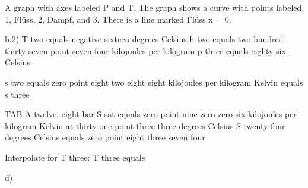 A graph with axes labeled P and T. The graph shows a curve with points labeled 1, Flüss, 2, Dampf, and 3. There is a line marked Flüss x = 0.

b.2) T two equals negative sixteen degrees Celsius  
h two equals two hundred thirty-seven point seven four kilojoules per kilogram  
p three equals eighty-six Celsius  

s two equals zero point eight two eight eight kilojoules per kilogram Kelvin equals s three  

TAB A twelve, eight bar  
S sat equals zero point nine zero zero six kilojoules per kilogram Kelvin at thirty-one point three three degrees Celsius  
S twenty-four degrees Celsius equals zero point eight three seven four  

Interpolate for T three:  
T three equals  

d)